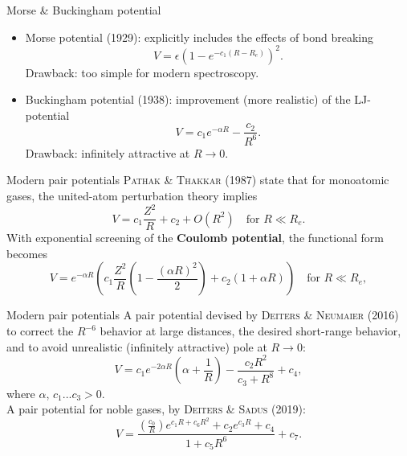\documentclass{beamer}
\def\D{\displaystyle}
\begin{document}
\begin{frame}{Morse \& Buckingham potential}
    \begin{itemize}
        \item Morse potential (1929): explicitly includes the effects of bond breaking
        \begin{equation}
            V = \epsilon(1-e^{-c_1(R-R_e)})^2.
        \end{equation}
        Drawback: too simple for modern spectroscopy.
        \item Buckingham potential (1938): improvement (more realistic) of the LJ-potential
        \begin{equation}
            V = c_1e^{-\alpha R} - \frac{c_2}{R^6}.
            \label{eq:buckingham}
        \end{equation}
        Drawback: infinitely attractive at $R \rightarrow 0$.
    \end{itemize}
\end{frame}
\begin{frame}{Modern pair potentials}
    \textsc{Pathak \& Thakkar} (1987) state that for monoatomic gases, the united-atom perturbation theory implies
    \begin{equation}
        V = c_1\frac{Z^2}{R} + c_2 + O(R^2) \quad \text{for }R \ll R_e.
        \label{eq:pathak}
    \end{equation}
    With exponential screening of the \textbf{Coulomb potential}, the functional form becomes
    \begin{equation}
        V = e^{-\alpha R}
        \left( c_1 \frac{Z^2}{R} 
        \left( 1 - \frac{(\alpha R)^2}{2} \right)
        + c_2(1+ \alpha R)\right) \quad \text{for }R \ll R_e,
        \label{eq:chargescreening}
    \end{equation}
\end{frame}
\begin{frame}{Modern pair potentials}
    A pair potential devised by \textsc{Deiters \& Neumaier} (2016) to correct the $R^{-6}$ behavior at large distances, the desired short-range behavior, and to avoid unrealistic (infinitely attractive) pole at $R \rightarrow 0$:
    \begin{equation}
        V = c_1 e^{-2\alpha R}\left(\alpha + \frac{1}{R}\right) - \frac{c_2R^2}{c_3 + R^8} + c_4,
        \label{eq:ljlike}
    \end{equation}
    where $\alpha$, $c_1$...$c_3 > 0$. \\
    
    A pair potential for noble gases, by \textsc{Deiters \& Sadus} (2019):
    \begin{equation}
        V = \frac{\left(\D\frac{c_0}{R}\right)e^{c_1R+c_6R^2} 
        + c_2e^{c_3R} + c_4}
        {1+ c_5R^6} + c_7.
    \end{equation}
\end{frame}
\end{document}
